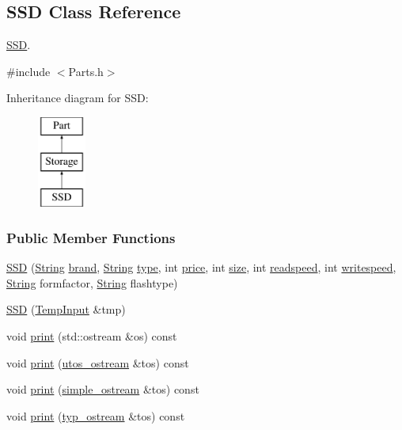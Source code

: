 \subsection{S\+SD Class Reference}
\label{class_s_s_d}


\mbox{\hyperlink{class_s_s_d}{S\+SD}}.  




{\ttfamily \#include $<$Parts.\+h$>$}

Inheritance diagram for S\+SD\+:\begin{figure}[H]
\begin{center}
\leavevmode
\includegraphics[height=3.000000cm]{class_s_s_d}
\end{center}
\end{figure}
\subsubsection*{Public Member Functions}
\begin{DoxyCompactItemize}
\item 
\mbox{\hyperlink{class_s_s_d_a1e80104276b02f8ca6f016f41a2a5f41}{S\+SD}} (\mbox{\hyperlink{class_string}{String}} \mbox{\hyperlink{class_part_ae06f2fdeb7fbbdb229a7aca151f3e341}{brand}}, \mbox{\hyperlink{class_string}{String}} \mbox{\hyperlink{class_part_a101dbcc5c4b21564df7414c7eb0eae88}{type}}, int \mbox{\hyperlink{class_part_a8e71223aed1da95a974f33d8d6c91bb1}{price}}, int \mbox{\hyperlink{class_storage_abcc80ce58a21fa884035617ee0b6cb67}{size}}, int \mbox{\hyperlink{class_storage_a41073842ff16961dad3903e6dd49bb0c}{readspeed}}, int \mbox{\hyperlink{class_storage_a0198a1483ccf849d48c76da88599ba8b}{writespeed}}, \mbox{\hyperlink{class_string}{String}} formfactor, \mbox{\hyperlink{class_string}{String}} flashtype)
\item 
\mbox{\hyperlink{class_s_s_d_a21d101c62d384539899d6af07baa4a83}{S\+SD}} (\mbox{\hyperlink{struct_temp_input}{Temp\+Input}} \&tmp)
\item 
void \mbox{\hyperlink{class_s_s_d_a3c07aa0fd7bb547cfb4a775513e427a9}{print}} (std\+::ostream \&os) const
\item 
void \mbox{\hyperlink{class_s_s_d_ab07086e302f8be99cfa757583d2017a0}{print}} (\mbox{\hyperlink{structutos__ostream}{utos\+\_\+ostream}} \&tos) const
\item 
void \mbox{\hyperlink{class_s_s_d_a7efed56d8590399c61d8eefca9295c91}{print}} (\mbox{\hyperlink{structsimple__ostream}{simple\+\_\+ostream}} \&tos) const
\item 
void \mbox{\hyperlink{class_s_s_d_a6e252152f8ba75043edec67e19d686e0}{print}} (\mbox{\hyperlink{structtyp__ostream}{typ\+\_\+ostream}} \&tos) const
\end{DoxyCompactItemize}
